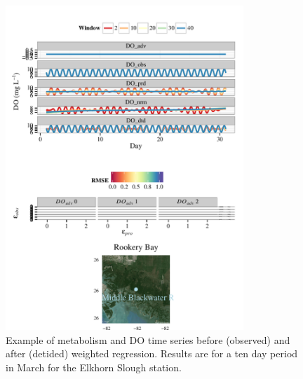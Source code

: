 \documentclass[letterpaper,12pt,oneside]{article}\usepackage[]{graphicx}\usepackage[]{color}
\newenvironment{knitrout}{}{} %
\begin{document}
\begin{knitrout}
\begin{figure}[!ht]
{\centering \includegraphics[width=0.8\textwidth]{figure/case_ex2} 

}

\caption[Example of metabolism and \ac{DO} time series before (observed) and after (detided) weighted regression]{Example of metabolism and \ac{DO} time series before (observed) and after (detided) weighted regression. Results are for a ten day period in March for the Elkhorn Slough station.\label{fig:case_ex2}}
\end{figure}


\end{knitrout}
\vfill
\clearpage
\end{document}
